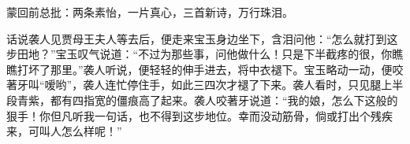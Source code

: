 \begin{parag}
    \begin{note}蒙回前总批：两条素怡，一片真心，三首新诗，万行珠泪。\end{note}
\end{parag}


\begin{parag}
    话说袭人见贾母王夫人等去后，便走来宝玉身边坐下，含泪问他：“怎么就打到这步田地？”宝玉叹气说道：“不过为那些事，问他做什么！只是下半截疼的很，你瞧瞧打坏了那里。”袭人听说，便轻轻的伸手进去，将中衣褪下。宝玉略动一动，便咬著牙叫“嗳哟”，袭人连忙停住手，如此三四次才褪了下来。袭人看时，只见腿上半段青紫，都有四指宽的僵痕高了起来。袭人咬著牙说道：“我的娘，怎么下这般的狠手！你但凡听我一句话，也不得到这步地位。幸而没动筋骨，倘或打出个残疾来，可叫人怎么样呢！”
\end{parag}


